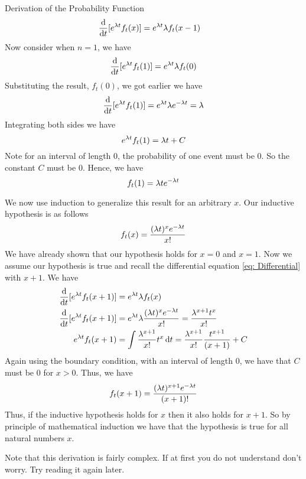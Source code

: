 \begin{theory}{Derivation of the Probability Function}
\begin{align}
    \frac{\operatorname{d}\!{}}{\operatorname{d}\!{t}} [e^{\lambda t} f_t(x)] &= e^{\lambda t} \lambda f_t(x-1) \label{eq: Differential}
\end{align}
Now consider when $n = 1$, we have
\[
    \frac{\operatorname{d}\!{}}{\operatorname{d}\!{t}} [e^{\lambda t} f_t(1)] = e^{\lambda t} \lambda f_t(0)
\]
Substituting the result, $f_t(0)$, we got earlier we have
\[
    \frac{\operatorname{d}\!{}}{\operatorname{d}\!{t}} [e^{\lambda t} f_t(1)] = e^{\lambda t} \lambda e^{-\lambda t} = \lambda  
\]
Integrating both sides we have
\[
    e^{\lambda t} f_t(1) = \lambda t + C
\]
Note for an interval of length 0, the probability of one event must be 0. So the constant $C$ must be 0. Hence, we have
\[
    f_t(1) = \lambda t e^{-\lambda t}
\]
\par\smallskip
We now use induction to generalize this result for an arbitrary $x$. Our inductive hypothesis is as follows
\[
    f_t(x) = \frac{(\lambda t)^x e^{-\lambda t}}{x!}
\]
We have already shown that our hypothesis holds for $x = 0$ and $x = 1$. Now we assume our hypothesis is true and recall the differential equation \eqref{eq: Differential} with $x+1$. We have
\begin{align*}
    \frac{\operatorname{d}\!{}}{\operatorname{d}\!{t}} [e^{\lambda t} f_t(x+1)] &= e^{\lambda t} \lambda f_t(x) \\
    \frac{\operatorname{d}\!{}}{\operatorname{d}\!{t}} [e^{\lambda t} f_t(x+1)] &= e^{\lambda t} \lambda \frac{(\lambda t)^x e^{-\lambda t}}{x!} 
    = \frac{\lambda^{x+1} t^x}{x!} \\
    e^{\lambda t} f_t(x+1) &= \int \frac{\lambda^{x+1}}{x!} t^x \operatorname{d}\!{t} 
    = \frac{\lambda^{x+1}}{x!}\frac{t^{x+1}}{(x+1)} + C
\end{align*}
Again using the boundary condition, with an interval of length 0, we have that $C$ must be 0 for $x>0$. Thus, we have
\[
    f_t(x+1) = \frac{(\lambda t)^{x+1} e^{-\lambda t}}{(x+1)!}
\]
Thus, if the inductive hypothesis holds for $x$ then it also holds for $x+1$. So by principle of mathematical induction we have that the hypothesis is true for all natural numbers $x$. 
\end{theory}
\begin{info}
Note that this derivation is fairly complex. If at first you do not understand don't worry. Try reading it again later.
\end{info}
